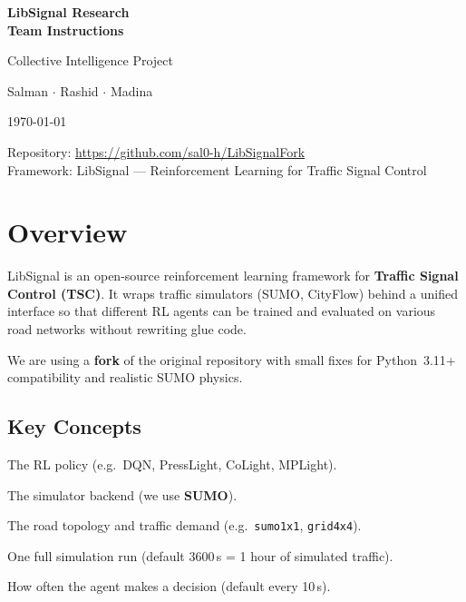 \documentclass[11pt,a4paper]{article}
\begin{document}
\begin{titlepage}
\centering
\vspace*{3cm}
{\Huge\bfseries LibSignal Research\\[0.4cm] Team Instructions\par}
\vspace{1.5cm}
{\Large Collective Intelligence Project\par}
\vspace{1cm}
{\large Salman $\cdot$ Rashid $\cdot$ Madina\par}
\vspace{2cm}
{\large \today\par}
\vfill
{\normalsize
Repository: \url{https://github.com/sal0-h/LibSignalFork}\\[0.3cm]
Framework: LibSignal --- Reinforcement Learning for Traffic Signal Control}
\end{titlepage}

\tableofcontents
\newpage

\section{Overview}

LibSignal is an open-source reinforcement learning framework for \textbf{Traffic Signal Control (TSC)}.
It wraps traffic simulators (SUMO, CityFlow) behind a unified interface so that different RL agents can be trained and evaluated on various road networks without rewriting glue code.

We are using a \textbf{fork} of the original repository with small fixes for Python~3.11+ compatibility and realistic SUMO physics.

\subsection{Key Concepts}
\begin{description}[leftmargin=3cm, style=nextline]
    \item[Agent] The RL policy (e.g.\ DQN, PressLight, CoLight, MPLight).
    \item[World] The simulator backend (we use \textbf{SUMO}).
    \item[Network] The road topology and traffic demand (e.g.\ \texttt{sumo1x1}, \texttt{grid4x4}).
    \item[Episode] One full simulation run (default 3600\,s = 1 hour of simulated traffic).
    \item[Action Interval] How often the agent makes a decision (default every 10\,s).
\end{description}
\end{document}
